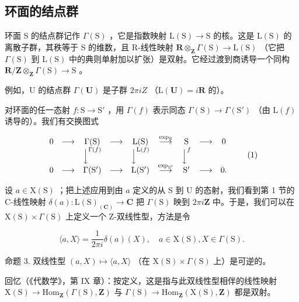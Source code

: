 \subsection{环面的结点群}

环面 S 的结点群记作 \(\Gamma(\mathrm{S})\) ，它是指数映射 \(\mathrm{L}(\mathrm{S}) \to \mathrm{S}\) 的核。这是 \(\mathrm{L}(\mathrm{S})\) 的离散子群，其秩等于 S 的维数，且 R-线性映射 \(\mathbf{R} \otimes_{\mathbf{Z}} \Gamma(\mathrm{S}) \to \mathrm{L}(\mathrm{S})\) （它把 \(\Gamma(\mathrm{S})\) 到 \(\mathrm{L}(\mathrm{S})\) 中的典则单射加以扩张）是双射。它经过渡到商诱导一个同构 \(\mathbf{R}/\mathbf{Z} \otimes_{\mathbf{Z}} \Gamma(\mathrm{S}) \to \mathrm{S}\) 。

例如，U 的结点群 \(\Gamma(\mathbf{U})\) 是子群 \(2\pi iZ\) （\(\mathrm{L}(\mathbf{U}) = i\mathbf{R}\) 的）。

对环面的任一态射 \(f: \mathrm{S} \to \mathrm{S}'\) ，用 \(\Gamma(f)\) 表示同态 \(\Gamma(\mathrm{S}) \to \Gamma(\mathrm{S}')\) （由 \(\mathrm{L}(f)\) 诱导的）。我们有交换图式

\[
\begin{array}{c c c c c c c c c} 0 & \longrightarrow & \Gamma (\mathrm{S}) & \longrightarrow & \mathrm{L} (\mathrm{S}) & \stackrel {{\exp_ {\mathrm{S}}}} {{\longrightarrow}} & \mathrm{S} & \longrightarrow & 0 \\ & & \Big \downarrow^ {\Gamma (f)} & & \Big \downarrow^ {\mathrm{L} (f)} & & \Big \downarrow^ {f} \\ 0 & \longrightarrow & \Gamma (\mathrm{S} ^ {\prime}) & \longrightarrow & \mathrm{L} (\mathrm{S} ^ {\prime}) & \stackrel {{\exp_ {\mathrm{S} ^ {\prime}}}} {{\longrightarrow}} & \mathrm{S} ^ {\prime} & \longrightarrow & 0. \end{array}\tag{1}
\]

设 \(a \in \mathrm{X}(\mathrm{S})\) ；把上述应用到由 \(a\) 定义的从 S 到 U 的态射，我们看到第 1 节的 C-线性映射 \(\delta(a) : \mathrm{L}(\mathrm{S})_{(\mathbf{C})} \to \mathbf{C}\) 把 \(\Gamma(\mathrm{S})\) 映到 \(2\pi i\mathbf{Z}\) 中。于是，我们可以在 \(\mathrm{X}(\mathrm{S}) \times \Gamma(\mathrm{S})\) 上定义一个 Z-双线性型，方法是令

\[
\langle a, X \rangle = \frac {1}{2 \pi i} \delta (a) (X), \quad a \in \mathrm{X(S)}, X \in \Gamma (\mathrm{S}).\tag{2}
\]

命题 3. 双线性型 \((a,X)\mapsto \langle a,X\rangle\) （在 \(\mathrm{X(S)}\times \Gamma (\mathrm{S})\) 上）是可逆的。

回忆（《代数学》，第 IX 章）：按定义，这是指与此双线性型相伴的线性映射 \(\mathrm{X}(\mathrm{S}) \to \mathrm{Hom}_{\mathbf{Z}}(\varGamma(\mathrm{S}), \mathbf{Z})\) 与 \(\varGamma(\mathrm{S}) \to \mathrm{Hom}_{\mathbf{Z}}(\mathrm{X}(\mathrm{S}), \mathbf{Z})\) 都是双射。

